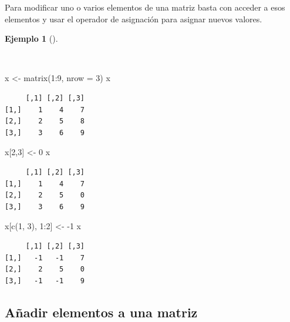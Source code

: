 \documentclass[
  a4paper,
]{scrreport}
\newenvironment{Shaded}{\begin{snugshade}}{\end{snugshade}}
\newcommand{\AttributeTok}[1]{\textcolor[rgb]{0.40,0.45,0.13}{#1}}
\newcommand{\DecValTok}[1]{\textcolor[rgb]{0.68,0.00,0.00}{#1}}
\newcommand{\FunctionTok}[1]{\textcolor[rgb]{0.28,0.35,0.67}{#1}}
\newcommand{\NormalTok}[1]{\textcolor[rgb]{0.00,0.23,0.31}{#1}}
\newcommand{\OtherTok}[1]{\textcolor[rgb]{0.00,0.23,0.31}{#1}}
\newcommand{\SpecialCharTok}[1]{\textcolor[rgb]{0.37,0.37,0.37}{#1}}
\theoremstyle{definition}
\theoremstyle{definition}
\newtheorem{example}{Ejemplo}[chapter]
\theoremstyle{remark}
\begin{document}
Para modificar uno o varios elementos de una matriz basta con acceder a
esos elementos y usar el operador de asignación para asignar nuevos
valores.

\begin{example}[]\protect\hypertarget{exm-modificacion-matriz}{}\label{exm-modificacion-matriz}

~

\begin{Shaded}
\begin{Highlighting}[]
\NormalTok{x }\OtherTok{\textless{}{-}} \FunctionTok{matrix}\NormalTok{(}\DecValTok{1}\SpecialCharTok{:}\DecValTok{9}\NormalTok{, }\AttributeTok{nrow =} \DecValTok{3}\NormalTok{)}
\NormalTok{x}
\end{Highlighting}
\end{Shaded}

\begin{verbatim}
     [,1] [,2] [,3]
[1,]    1    4    7
[2,]    2    5    8
[3,]    3    6    9
\end{verbatim}

\begin{Shaded}
\begin{Highlighting}[]
\NormalTok{x[}\DecValTok{2}\NormalTok{,}\DecValTok{3}\NormalTok{] }\OtherTok{\textless{}{-}} \DecValTok{0}
\NormalTok{x}
\end{Highlighting}
\end{Shaded}

\begin{verbatim}
     [,1] [,2] [,3]
[1,]    1    4    7
[2,]    2    5    0
[3,]    3    6    9
\end{verbatim}

\begin{Shaded}
\begin{Highlighting}[]
\NormalTok{x[}\FunctionTok{c}\NormalTok{(}\DecValTok{1}\NormalTok{, }\DecValTok{3}\NormalTok{), }\DecValTok{1}\SpecialCharTok{:}\DecValTok{2}\NormalTok{] }\OtherTok{\textless{}{-}} \SpecialCharTok{{-}}\DecValTok{1}
\NormalTok{x}
\end{Highlighting}
\end{Shaded}

\begin{verbatim}
     [,1] [,2] [,3]
[1,]   -1   -1    7
[2,]    2    5    0
[3,]   -1   -1    9
\end{verbatim}

\end{example}

\subsection{Añadir elementos a una
matriz}\label{auxf1adir-elementos-a-una-matriz}
\end{document}
